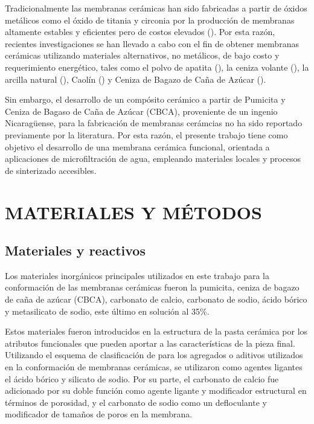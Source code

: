 \documentclass{article}
\begin{document}
Tradicionalmente las membranas cerámicas han sido fabricadas a partir 
de óxidos metálicos como el óxido de titania y circonia por la 
producción de membranas altamente estables y eficientes pero de 
costos elevados (\cite{Gitis2016,Nandi2008}). Por esta razón, 
recientes investigaciones se han llevado a cabo con el fin de obtener 
membranas cerámicas utilizando materiales alternativos, no metálicos, 
de bajo costo y requerimiento energético, tales como el polvo de 
apatita (\cite{Masmoudi2007}),  la ceniza volante (\cite{Saffaj2004}), 
la arcilla natural (\cite{Saffaj2005}), Caolín (\cite{Rawat2018}) y 
Ceniza de Bagazo de Caña de Azúcar (\cite{Andrade2019}). 

Sin embargo, el desarrollo de un compósito cerámico a partir de 
Pumicita y Ceniza de Bagaso de Caña de Azúcar (CBCA), proveniente de 
un ingenio Nicaragüense, para la fabricación de membranas cerámcias 
no ha sido reportado previamente por la literatura. 
Por esta razón, el presente trabajo tiene como objetivo el 
desarrollo de una membrana cerámica funcional, orientada a 
aplicaciones de microfiltración de agua, empleando materiales locales 
y procesos de sinterizado accesibles. 


\newpage
\section{MATERIALES Y MÉTODOS}
\subsection{Materiales y reactivos}
Los materiales inorgánicos principales utilizados en este trabajo 
para la conformación de las membranas cerámicas fueron la pumicita, 
ceniza de bagazo de caña de azúcar (CBCA), carbonato de calcio, 
carbonato de sodio, ácido bórico y metasilicato de sodio, este último 
en solución al 35\%. 

Estos materiales fueron introducidos en la estructura de la pasta 
cerámica por los atributos funcionales que pueden aportar a las 
características de la pieza final. Utilizando el esquema de 
clasificación de \textcite{Benito2004} para los agregados o aditivos 
utilizados en la conformación de membranas cerámicas, 
se utilizaron como agentes ligantes el ácido bórico y silicato de sodio. 
Por su parte, el carbonato de calcio fue adicionado por su doble 
función como agente ligante y modificador estructural en términos de 
porosidad, y el carbonato de sodio como un defloculante y 
modificador de tamaños de poros en la membrana. 
\end{document}
